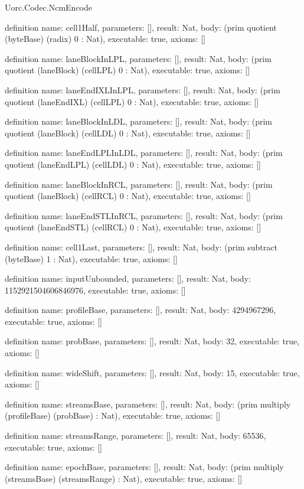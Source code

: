 \begin{lexlean}{Uorc.Codec.NcmEncode}
\begin{semanticmodule}
definition{
  name: cell1Half,
  parameters: [],
  result: Nat,
  body: (prim quotient (byteBase) (radix) 0 : Nat),
  executable: true,
  axioms: []
}

definition{
  name: laneBlockInLPL,
  parameters: [],
  result: Nat,
  body: (prim quotient (laneBlock) (cellLPL) 0 : Nat),
  executable: true,
  axioms: []
}

definition{
  name: laneEndIXLInLPL,
  parameters: [],
  result: Nat,
  body: (prim quotient (laneEndIXL) (cellLPL) 0 : Nat),
  executable: true,
  axioms: []
}

definition{
  name: laneBlockInLDL,
  parameters: [],
  result: Nat,
  body: (prim quotient (laneBlock) (cellLDL) 0 : Nat),
  executable: true,
  axioms: []
}

definition{
  name: laneEndLPLInLDL,
  parameters: [],
  result: Nat,
  body: (prim quotient (laneEndLPL) (cellLDL) 0 : Nat),
  executable: true,
  axioms: []
}

definition{
  name: laneBlockInRCL,
  parameters: [],
  result: Nat,
  body: (prim quotient (laneBlock) (cellRCL) 0 : Nat),
  executable: true,
  axioms: []
}

definition{
  name: laneEndSTLInRCL,
  parameters: [],
  result: Nat,
  body: (prim quotient (laneEndSTL) (cellRCL) 0 : Nat),
  executable: true,
  axioms: []
}

definition{
  name: cell1Last,
  parameters: [],
  result: Nat,
  body: (prim subtract (byteBase) 1 : Nat),
  executable: true,
  axioms: []
}

definition{
  name: inputUnbounded,
  parameters: [],
  result: Nat,
  body: 1152921504606846976,
  executable: true,
  axioms: []
}

definition{
  name: profileBase,
  parameters: [],
  result: Nat,
  body: 4294967296,
  executable: true,
  axioms: []
}

definition{
  name: probBase,
  parameters: [],
  result: Nat,
  body: 32,
  executable: true,
  axioms: []
}

definition{
  name: wideShift,
  parameters: [],
  result: Nat,
  body: 15,
  executable: true,
  axioms: []
}

definition{
  name: streamsBase,
  parameters: [],
  result: Nat,
  body: (prim multiply (profileBase) (probBase) : Nat),
  executable: true,
  axioms: []
}

definition{
  name: streamsRange,
  parameters: [],
  result: Nat,
  body: 65536,
  executable: true,
  axioms: []
}

definition{
  name: epochBase,
  parameters: [],
  result: Nat,
  body: (prim multiply (streamsBase) (streamsRange) : Nat),
  executable: true,
  axioms: []
}


\end{semanticmodule}
\end{lexlean}
